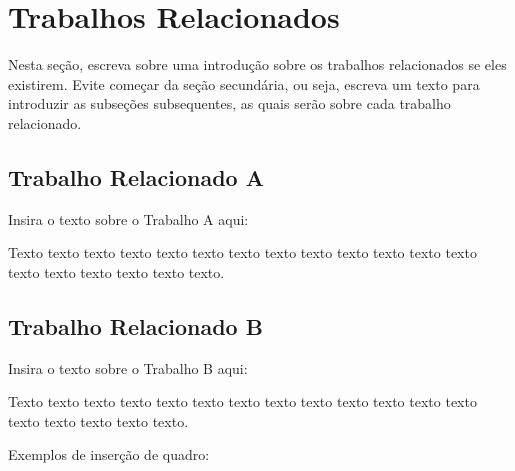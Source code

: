 \chapter{Trabalhos Relacionados}
\label{cap:trabalhos-relacionados}

Nesta seção, escreva sobre uma introdução sobre os trabalhos relacionados se eles existirem. Evite começar da seção secundária, ou seja, escreva um texto para introduzir as subseções subsequentes, as quais serão sobre cada trabalho relacionado.

\section{Trabalho Relacionado A}
\label{sec:trabalho-relacionado-a}

Insira o texto sobre o Trabalho A aqui:

Texto texto texto texto texto texto texto texto texto texto texto texto texto texto texto texto texto texto texto.

\section{Trabalho Relacionado B}
\label{sec:trabalho-relacionado-b}

Insira o texto sobre o Trabalho B aqui:

Texto texto texto texto texto texto texto texto texto texto texto texto texto texto texto texto texto texto.

Exemplos de inserção de quadro:


	\begin{quadro}[h!]
		\centering
	\end{quadro}



